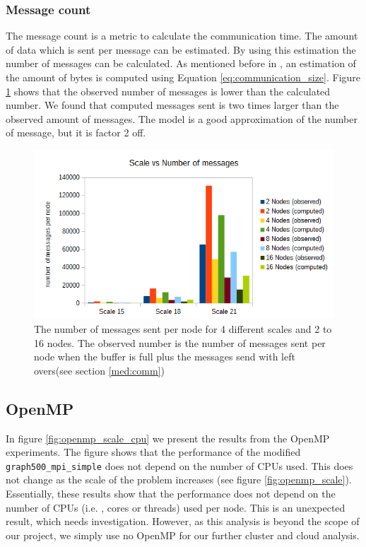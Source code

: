 \subsubsection{Message count}
The message count is a metric to calculate the communication time. The amount of data which is sent per message can be estimated. By using this estimation the number of messages can be calculated. As mentioned before in \cite{suzumura2011performance}, an estimation of the amount of bytes is computed using Equation \ref{eq:communication_size}. Figure \ref{fig:das_scale_messages} shows that the observed number of messages is lower than the calculated number. We found that computed messages sent is two times larger than the observed amount of messages. The model is a good approximation of the number of message, but it is factor 2 off.
\begin{figure}[!h]
\includegraphics[width=\linewidth]{images/scale_vs_messages.png}
\caption{The number of messages sent per node for 4 different scales and 2 to 16 nodes. The observed number is the number of messages sent per node when the buffer is full plus the messages send with left overs(see section \ref{med:comm})}
\label{fig:das_scale_messages}
\end{figure}


\subsection{OpenMP}
\label{sec:openmp}
In figure \ref{fig:openmp_scale_cpu} we present the results from the OpenMP experiments. 
The figure shows that the performance of the modified \texttt{graph500\_mpi\_simple} does not depend on the number of CPUs used. This does not change as the scale of the problem increases (see figure \ref{fig:openmp_scale}). Essentially, these results show that the performance does not depend on the number of CPUs (i.e. , cores or threads) used per node. This is an unexpected result, which needs investigation. However, as this analysis is beyond the scope of our project, we simply use no OpenMP for our further cluster and cloud analysis. 

